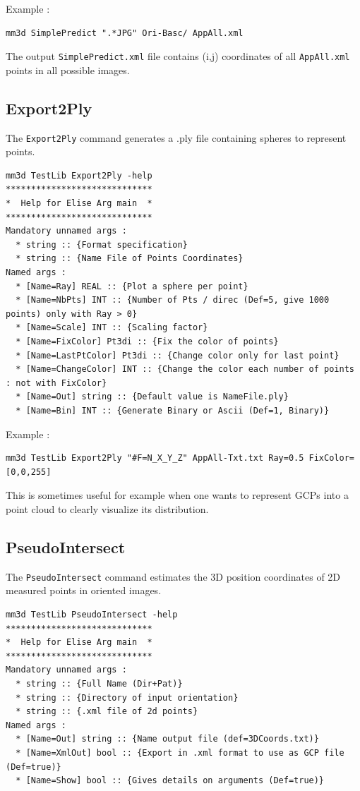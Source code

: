 Example :
\begin{verbatim}
mm3d SimplePredict ".*JPG" Ori-Basc/ AppAll.xml
\end{verbatim}

The output {\tt SimplePredict.xml} file contains (i,j) coordinates of all {\tt AppAll.xml} points in all possible images.

\subsection{Export2Ply}
The {\tt Export2Ply} command generates a .ply file containing spheres to represent points.

\begin{verbatim}
mm3d TestLib Export2Ply -help
*****************************
*  Help for Elise Arg main  *
*****************************
Mandatory unnamed args : 
  * string :: {Format specification}
  * string :: {Name File of Points Coordinates}
Named args : 
  * [Name=Ray] REAL :: {Plot a sphere per point}
  * [Name=NbPts] INT :: {Number of Pts / direc (Def=5, give 1000 points) only with Ray > 0}
  * [Name=Scale] INT :: {Scaling factor}
  * [Name=FixColor] Pt3di :: {Fix the color of points}
  * [Name=LastPtColor] Pt3di :: {Change color only for last point}
  * [Name=ChangeColor] INT :: {Change the color each number of points : not with FixColor}
  * [Name=Out] string :: {Default value is NameFile.ply}
  * [Name=Bin] INT :: {Generate Binary or Ascii (Def=1, Binary)}
\end{verbatim}

Example :
\begin{verbatim}
mm3d TestLib Export2Ply "#F=N_X_Y_Z" AppAll-Txt.txt Ray=0.5 FixColor=[0,0,255]
\end{verbatim}

This is sometimes useful for example when one wants to represent GCPs into a point cloud to clearly visualize its distribution.

\subsection{PseudoIntersect}
The {\tt PseudoIntersect} command estimates the 3D position coordinates of 2D measured points in oriented images.

\begin{verbatim}
mm3d TestLib PseudoIntersect -help
*****************************
*  Help for Elise Arg main  *
*****************************
Mandatory unnamed args : 
  * string :: {Full Name (Dir+Pat)}
  * string :: {Directory of input orientation}
  * string :: {.xml file of 2d points}
Named args : 
  * [Name=Out] string :: {Name output file (def=3DCoords.txt)}
  * [Name=XmlOut] bool :: {Export in .xml format to use as GCP file (Def=true)}
  * [Name=Show] bool :: {Gives details on arguments (Def=true)}
\end{verbatim}


